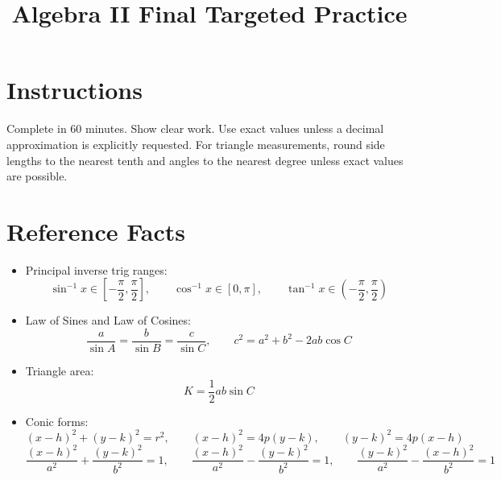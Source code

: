 \documentclass[12pt]{article}
\title{Algebra II Final Targeted Practice}
\author{}
\date{}
\begin{document}
\maketitle

\section*{Instructions}
Complete in 60 minutes. Show clear work. Use exact values unless a decimal approximation is explicitly requested. For triangle measurements, round side lengths to the nearest tenth and angles to the nearest degree unless exact values are possible.

\section*{Reference Facts}
\begin{itemize}[leftmargin=1.5em]
  \item Principal inverse trig ranges:
  \[
  \sin^{-1}x\in\left[-\frac{\pi}{2},\frac{\pi}{2}\right],\qquad
  \cos^{-1}x\in[0,\pi],\qquad
  \tan^{-1}x\in\left(-\frac{\pi}{2},\frac{\pi}{2}\right)
  \]
  \item Law of Sines and Law of Cosines:
  \[
  \frac{a}{\sin A}=\frac{b}{\sin B}=\frac{c}{\sin C},\qquad
  c^2=a^2+b^2-2ab\cos C
  \]
  \item Triangle area:
  \[
  K=\frac12 ab\sin C
  \]
  \item Conic forms:
  \[
  (x-h)^2+(y-k)^2=r^2,\qquad (x-h)^2=4p(y-k),\qquad (y-k)^2=4p(x-h)
  \]
  \[
  \frac{(x-h)^2}{a^2}+\frac{(y-k)^2}{b^2}=1,\qquad
  \frac{(x-h)^2}{a^2}-\frac{(y-k)^2}{b^2}=1,\qquad
  \frac{(y-k)^2}{a^2}-\frac{(x-h)^2}{b^2}=1
  \]
\end{itemize}
\end{document}
